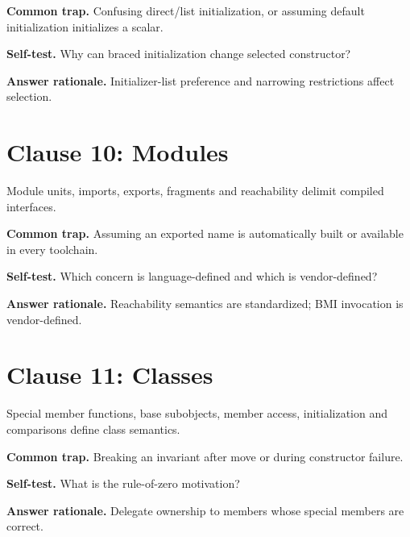\documentclass[11pt]{article}
\begin{document}
\textbf{Common trap.} Confusing direct/list initialization, or assuming default initialization initializes a scalar.

\textbf{Self-test.} Why can braced initialization change selected constructor?

\textbf{Answer rationale.} Initializer-list preference and narrowing restrictions affect selection.

\section{Clause 10: Modules}
Module units, imports, exports, fragments and reachability delimit compiled interfaces.

\textbf{Common trap.} Assuming an exported name is automatically built or available in every toolchain.

\textbf{Self-test.} Which concern is language-defined and which is vendor-defined?

\textbf{Answer rationale.} Reachability semantics are standardized; BMI invocation is vendor-defined.

\section{Clause 11: Classes}
Special member functions, base subobjects, member access, initialization and comparisons define class semantics.

\textbf{Common trap.} Breaking an invariant after move or during constructor failure.

\textbf{Self-test.} What is the rule-of-zero motivation?

\textbf{Answer rationale.} Delegate ownership to members whose special members are correct.
\end{document}
